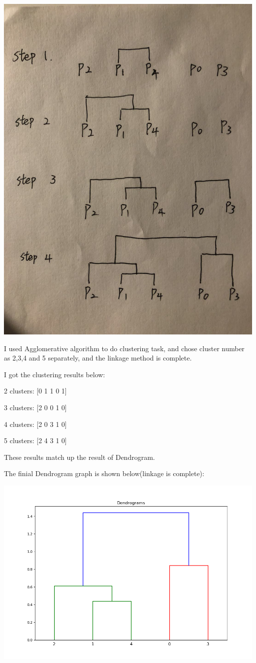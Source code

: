 \documentclass{article}
\begin{document}
\includegraphics[scale=0.2]{steps.jpeg}

I used Agglomerative algorithm to do clustering task, and chose cluster number as 2,3,4 and 5 separately, and the linkage method is complete.

I got the clustering results below:

2 clusters: [0 1 1 0 1]

3 clusters: [2 0 0 1 0]

4 clusters: [2 0 3 1 0]

5 clusters: [2 4 3 1 0]

These results match up the result of Dendrogram.

The finial Dendrogram graph is shown below(linkage is complete):

\includegraphics[scale=0.4]{Dendrograms.png}
\end{document}
